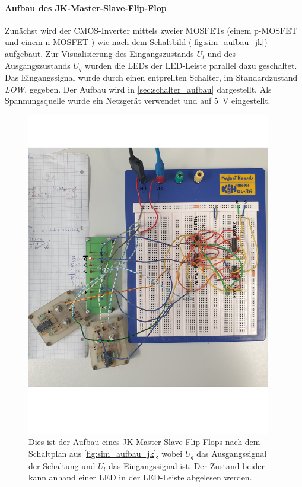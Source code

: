 \documentclass[12pt,english,ngerman]{scrartcl}
\begin{document}
\paragraph{Aufbau des JK-Master-Slave-Flip-Flop}\label{sec:mess_cmos}
Zunächst wird der CMOS-Inverter mittels zweier MOSFETs (einem p-MOSFET \cite{ZVP2106A} und
einem n-MOSFET \cite{ZVN2106A}) wie nach dem Schaltbild (\autoref{fig:sim_aufbau_jk})
aufgebaut. Zur Visualisierung des Eingangszustands $U_l$ und des
Ausgangszustands $U_q$ wurden die LEDs der LED-Leiste parallel dazu geschaltet. Das
Eingangssignal wurde durch einen entprellten Schalter, im Standardzustand
\textit{LOW}, gegeben. Der Aufbau wird in \autoref{sec:schalter_aufbau} dargestellt. Als
Spannungsquelle wurde ein Netzgerät verwendet und auf \SI{5}{\volt}
eingestellt. 

\begin{figure}[H]
  \centering
    \includegraphics[width=0.95\textwidth]{./figures/messungen/jk/aufbau.png}
  \caption{Dies ist der Aufbau eines JK-Master-Slave-Flip-Flops nach dem
  Schaltplan aus \autoref{fig:sim_aufbau_jk}, wobei $U_q$ das Ausgangssignal
  der Schaltung und $U_l$ das Eingangssignal ist. Der Zustand
  beider kann anhand einer LED in der LED-Leiste abgelesen werden.}
  \label{fig:mess_aufbau_jk}
\end{figure}
\end{document}
